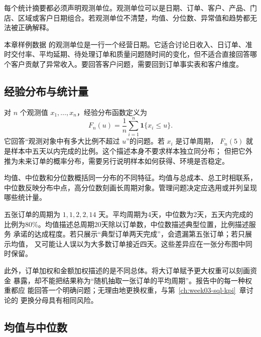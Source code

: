 \begin{convention}[观测单位]
每个统计摘要都必须声明观测单位。观测单位可以是日期、订单、客户、产品、门店、区域或客户日期组合。若观测单位不清楚，均值、分位数、异常值和趋势都无法被正确解释。
\end{convention}

本章样例数据  的观测单位是一行一个经营日期。它适合讨论日收入、日订单、准时交付率、平均延期、待处理订单和质量问题随时间的变化，但不适合直接回答哪个客户贡献了异常收入。要回答客户问题，需要回到订单事实表和客户维度。

\subsection{经验分布与统计量}
对 \(n\) 个观测值 \(x_1,\ldots,x_n\)，经验分布函数定义为
\begin{equation}
F_n(u)=\frac1n\sum_{i=1}^n\mathbf1\{x_i\le u\}.
\label{eq:empirical-cdf}
\end{equation}
它回答“观测对象中有多大比例不超过 \(u\)”的问题。若 \(x_i\) 是订单周期，
\(F_n(5)\) 就是样本中五天以内完成的比例。这个描述本身不要求样本独立同分布；
但把它外推为未来订单的概率分布，需要另行说明样本如何获得、环境是否稳定。

均值、中位数和分位数概括同一分布的不同特征。均值与总成本、总工时相联系，
中位数反映分布中点，高分位数刻画长周期对象。管理问题决定应选用或并列呈现
哪些统计量。

\begin{example}[同一个样本中的不同服务含义]
五张订单的周期为 \(1,1,2,2,14\) 天。平均周期为4天，中位数为2天，五天内完成的
比例为80\%。均值描述总周期20天除以订单数，中位数描述典型位置，比例描述服务
承诺的达成程度。若只展示“典型订单两天完成”，会遗漏第五张订单；若只展示均值，
又可能让人误以为大多数订单接近四天。这些差异应在一张分布图中同时保留。
\end{example}

此外，订单加权和金额加权描述的是不同总体。将大订单赋予更大权重可以刻画资金
暴露，却不能把结果称为“随机抽取一张订单的平均周期”。报告中的每一种权重都应
能回答一个明确问题；无理由地更换权重，与第~\ref{ch:week03-sql-kpi}~章讨论的
更换分母具有相同风险。

\subsection{均值与中位数}

